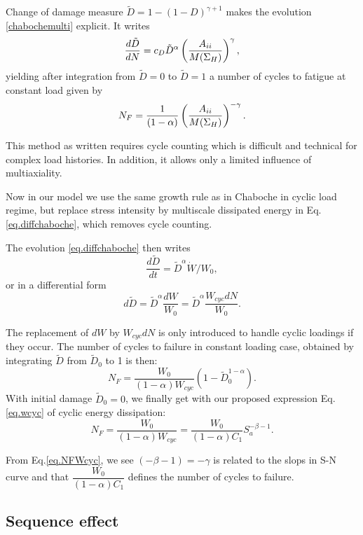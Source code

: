 Change of damage measure $\tilde{D} = 1 - (1-D)^{\gamma+1}$ makes the evolution \eqref{chabochemulti} explicit. It writes
\begin{equation}
\dfrac{d\tilde{D}}{dN} = c_D {\tilde{D}}^\alpha \left(\dfrac{{A}_{\uppercase\expandafter{\romannumeral2}}}{M(\Sigma_{H})} \right) ^\gamma,
\label{eq.diffchaboche}
\end{equation}
yielding after integration from $\tilde{D}=0$ to $\tilde{D}=1$  a number of cycles to fatigue at constant load given by
$$
N_F =\dfrac{1}{(1-\alpha)}\left(\dfrac{{A}_{\uppercase\expandafter{\romannumeral2}}}{M(\Sigma_{H})} \right) ^{-\gamma}.
$$

This method as written requires cycle counting which is difficult and technical for complex load histories. In addition, it allows only a limited influence of multiaxiality.


Now in our model we use the same growth rule as in Chaboche in cyclic load regime, but replace stress intensity by multiscale dissipated energy  in Eq.\eqref{eq.diffchaboche}, which removes cycle counting.

The evolution \eqref{eq.diffchaboche} then writes
$$
\dfrac{d\tilde{D}}{dt} ={\tilde{D}}^\alpha \dot{W}/W_0,
$$
or in a differential form
\begin{equation}
d \tilde{D}=\tilde{D}^\alpha\dfrac{d W}{W_0}=\tilde{D}^\alpha\dfrac{W_{cyc}d N}{W_0}.
\label{eq.DWcyc}
\end{equation}

The replacement of $d W$ by $W_{cyc}dN$ is only introduced to handle cyclic loadings if they occur. The number of cycles to failure in constant loading case, obtained by integrating $\tilde{D}$ from $\tilde{D}_0$ to 1 is then:
$$N_F=\dfrac{W_0}{\left( 1-\alpha\right)W_{cyc} }\left( 1-\tilde{D}_0^{1-\alpha}\right) .$$
With initial damage $\tilde{D}_0=0$, we finally get with our proposed expression Eq.\eqref{eq.wcyc} of cyclic energy dissipation:
\begin{equation}
N_F=\dfrac{W_0}{\left( 1-\alpha\right)W_{cyc} }=\dfrac{W_0}{(1-\alpha)C_1}S_{a}^{-\beta-1}.
\label{eq.NFWcyc}
\end{equation}

From Eq.\eqref{eq.NFWcyc}, we see $(-\beta-1)=-\gamma$ is related to the slops in S-N curve and that $\dfrac{W_0}{(1-\alpha)C_1}$ defines the number of cycles to failure.
\subsection{Sequence effect}


